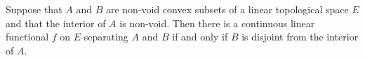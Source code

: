 Suppose that $A$ and $B$ are non-void convex subsets of a linear topological space $E$ and that the interior of $A$ is non-void. Then there is a continuous linear functional $f$ on $E$ separating $A$ and $B$ if and only if $B$ is disjoint from the interior of $A$.
